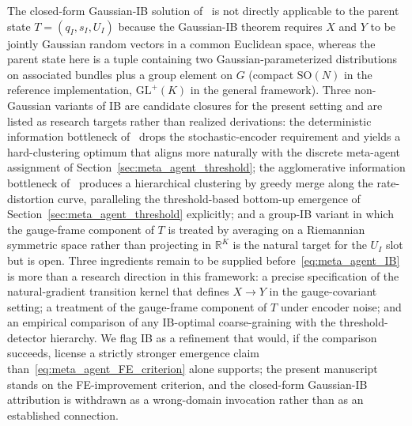 \documentclass[11pt]{article}
\begin{document}
The closed-form Gaussian-IB solution of~\cite{chechik2005information} is not directly applicable to the parent state $T = (q_I, s_I, U_I)$ because the Gaussian-IB theorem requires $X$ and $Y$ to be jointly Gaussian random vectors in a common Euclidean space, whereas the parent state here is a tuple containing two Gaussian-parameterized distributions on associated bundles plus a group element on $G$ (compact $\mathrm{SO}(N)$ in the reference implementation, $\mathrm{GL}^+(K)$ in the general framework). Three non-Gaussian variants of IB are candidate closures for the present setting and are listed as research targets rather than realized derivations: the deterministic information bottleneck of~\cite{StrouseSchwab2017} drops the stochastic-encoder requirement and yields a hard-clustering optimum that aligns more naturally with the discrete meta-agent assignment of Section~\ref{sec:meta_agent_threshold}; the agglomerative information bottleneck of~\cite{SlonimTishby2000} produces a hierarchical clustering by greedy merge along the rate-distortion curve, paralleling the threshold-based bottom-up emergence of Section~\ref{sec:meta_agent_threshold} explicitly; and a group-IB variant in which the gauge-frame component of $T$ is treated by averaging on a Riemannian symmetric space rather than projecting in $\mathbb{R}^K$ is the natural target for the $U_I$ slot but is open. Three ingredients remain to be supplied before~\eqref{eq:meta_agent_IB} is more than a research direction in this framework: a precise specification of the natural-gradient transition kernel that defines $X \to Y$ in the gauge-covariant setting; a treatment of the gauge-frame component of $T$ under encoder noise; and an empirical comparison of any IB-optimal coarse-graining with the threshold-detector hierarchy. We flag IB as a refinement that would, if the comparison succeeds, license a strictly stronger emergence claim than~\eqref{eq:meta_agent_FE_criterion} alone supports; the present manuscript stands on the FE-improvement criterion, and the closed-form Gaussian-IB attribution is withdrawn as a wrong-domain invocation rather than as an established connection.
\end{document}
